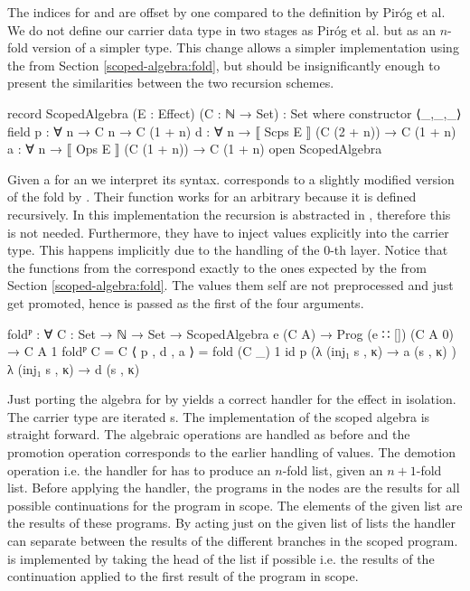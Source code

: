 The indices for  and  are offset by one compared to
the definition by Piróg et al.
We do not define our carrier data type in two stages as Piróg et al. but as an
$n$-fold version of a simpler type.
This change allows a simpler implementation using the  from
Section \ref{scoped-algebra:fold}, but should be insignificantly enough to
present the similarities between the two recursion schemes.

\begin{code}
record ScopedAlgebra (E : Effect) (C : ℕ → Set) : Set where
  constructor ⟨_,_,_⟩
  field
    p : ∀ {n} → C n                      → C (1 + n)
    d : ∀ {n} → ⟦ Scps  E ⟧ (C (2 + n))  → C (1 + n)
    a : ∀ {n} → ⟦ Ops   E ⟧ (C (1 + n))  → C (1 + n)
open ScopedAlgebra
\end{code}
Given a  for an  we
interpret its syntax.
 corresponds to a slightly modified version of the fold by
\textcite{DBLP:conf/lics/PirogSWJ18}.
Their function works for an arbitrary  because it is defined
recursively. 
In this implementation the recursion is abstracted in ,
therefore this is not needed.
Furthermore, they have to inject values explicitly into the carrier type.
This happens implicitly due to the handling of the $0$-th layer.
Notice that the functions from the  correspond
exactly to the ones expected by the  from Section
\ref{scoped-algebra:fold}.
The values them self are not preprocessed and just get promoted, hence
 is passed as the first of the four arguments.

\begin{code}
foldᴾ : ∀ {C : Set → ℕ → Set} → ScopedAlgebra e (C A) → 
  Prog (e ∷ []) (C A 0) → C A 1
foldᴾ {C = C} ⟨ p , d , a ⟩ = fold (C _) 1 id p
  (λ{ (inj₁ s , κ) → a (s , κ) }) λ{ (inj₁ s , κ) → d (s , κ) }
\end{code}
Just porting the algebra for  by
\textcite{DBLP:conf/lics/PirogSWJ18} yields a
correct handler for the effect in isolation.
The carrier type are iterated s.
The implementation of the scoped algebra is straight forward.
The algebraic operations are handled as before and the promotion operation
corresponds to the earlier handling of values.
The demotion operation i.e. the handler for  has
to produce an $n$-fold list, given an $n+1$-fold list.
Before applying the handler, the programs in the 
nodes are the results for all possible continuations for the program in scope.
The elements of the given list are the results of these programs.
By acting just on the given list of lists the handler can separate between the
results of the different branches in the scoped program.
 is implemented by taking the head of the list if possible
i.e. the results of the continuation applied to the first result of the program
in scope.

